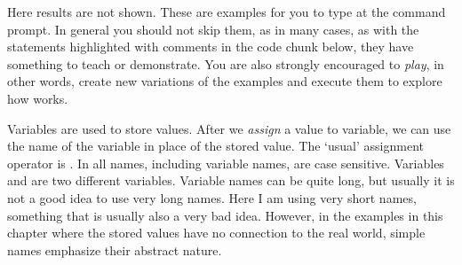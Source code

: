 \documentclass[krantz2]{krantz}\usepackage{knitr}%
\begin{document}
\begin{playground}
Here results are not shown. These are examples for you to type at the command prompt. In general you should not skip them, as in many cases, as with the statements highlighted with comments in the code chunk below, they have something to teach or demonstrate. You are also strongly encouraged to \emph{play}, in other words, create new variations of the examples and execute them to explore how \Rlang works.

\begin{knitrout}\footnotesize
{}\color{fgcolor}\begin{kframe}
\begin{alltt}
 \hlopt{+} 
 \hlopt{*} 
 \hlopt{+}  \hlopt{/} 
\hlstd{(} \hlopt{+} \hlstd{)} \hlopt{/} 
\hlopt{^} \hlopt{+} 
\hlstd{(}\hlstd{)}
 
  \hlstd{=} \hlstd{)}
 
\hlstd{(}\hlstd{)}
\hlstd{(}\hlstd{)}
\hlstd{(}\hlstd{)}
\hlstd{(}\hlstd{)}
\end{alltt}
\end{kframe}
\end{knitrout}

\end{playground}

Variables are used to store values. After we \emph{assign} a value to variable, we can use the name of the variable in place of the stored value. The `usual' assignment operator is \Roperator{<-}. In \Rlang all names, including variable names, are case sensitive. Variables  and  are two different variables. Variable names can be quite long, but usually it is not a good idea to use very long names. Here I am using very short names, something that is usually also a very bad idea. However, in the examples in this chapter where the stored values have no connection to the real world, simple names emphasize their abstract nature.
\end{document}
